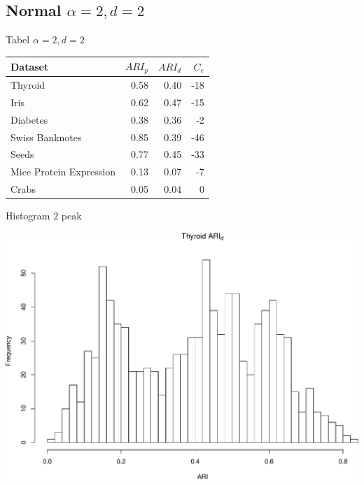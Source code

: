 \documentclass[ignorenonframetext,]{beamer}
\begin{document}
\subsection{\texorpdfstring{Normal
\(\alpha = 2, d = 2\)}{Normal \textbackslash{}alpha = 2, d = 2}}\label{normal-alpha-2-d-2}

\begin{frame}{Tabel \(\alpha = 2, d = 2\)}

\begin{center}


\begin{tabular}{l|r|r|r}
\hline
Dataset & ${ARI}_p$ & ${ARI}_d$ & $C_e$\\
\hline
Thyroid & 0.58 & 0.40 & -18\\
\hline
Iris & 0.62 & 0.47 & -15\\
\hline
Diabetes & 0.38 & 0.36 & -2\\
\hline
Swiss Banknotes & 0.85 & 0.39 & -46\\
\hline
Seeds & 0.77 & 0.45 & -33\\
\hline
Mice Protein Expression & 0.13 & 0.07 & -7\\
\hline
Crabs & 0.05 & 0.04 & 0\\
\hline
\end{tabular}

\end{center}

\end{frame}

\begin{frame}{Histogram 2 peak}

\begin{center}\includegraphics[width=1\linewidth]{Presentation_files/figure-beamer/unnamed-chunk-5-1} \end{center}

\end{frame}
\end{document}
